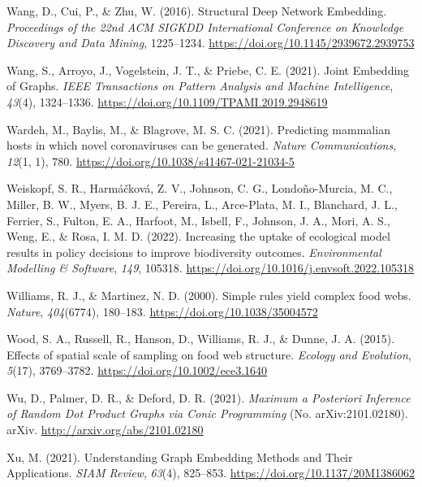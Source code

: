 \documentclass[10pt,oneside]{article}
\newlength{\cslhangindent}
\newenvironment{CSLReferences}[2] %
 {%
  \setlength{\parindent}{0pt}
  \ifodd #1 \everypar{\setlength{\hangindent}{\cslhangindent}}\ignorespaces\fi
  \ifnum #2 > 0
  \setlength{\parskip}{#2\baselineskip}
  \fi
 }%
 {}
\begin{document}
\begin{CSLReferences}{1}{0}
\leavevmode{}%
Wang, D., Cui, P., \& Zhu, W. (2016). Structural Deep Network Embedding.
\emph{Proceedings of the 22nd ACM SIGKDD International Conference on
Knowledge Discovery and Data Mining}, 1225--1234.
\url{https://doi.org/10.1145/2939672.2939753}

\leavevmode{}%
Wang, S., Arroyo, J., Vogelstein, J. T., \& Priebe, C. E. (2021). Joint
Embedding of Graphs. \emph{IEEE Transactions on Pattern Analysis and
Machine Intelligence}, \emph{43}(4), 1324--1336.
\url{https://doi.org/10.1109/TPAMI.2019.2948619}

\leavevmode{}%
Wardeh, M., Baylis, M., \& Blagrove, M. S. C. (2021). Predicting
mammalian hosts in which novel coronaviruses can be generated.
\emph{Nature Communications}, \emph{12}(1, 1), 780.
\url{https://doi.org/10.1038/s41467-021-21034-5}

\leavevmode{}%
Weiskopf, S. R., Harmáčková, Z. V., Johnson, C. G., Londoño-Murcia, M.
C., Miller, B. W., Myers, B. J. E., Pereira, L., Arce-Plata, M. I.,
Blanchard, J. L., Ferrier, S., Fulton, E. A., Harfoot, M., Isbell, F.,
Johnson, J. A., Mori, A. S., Weng, E., \& Rosa, I. M. D. (2022).
Increasing the uptake of ecological model results in policy decisions to
improve biodiversity outcomes. \emph{Environmental Modelling \&
Software}, \emph{149}, 105318.
\url{https://doi.org/10.1016/j.envsoft.2022.105318}

\leavevmode{}%
Williams, R. J., \& Martinez, N. D. (2000). Simple rules yield complex
food webs. \emph{Nature}, \emph{404}(6774), 180--183.
\url{https://doi.org/10.1038/35004572}

\leavevmode{}%
Wood, S. A., Russell, R., Hanson, D., Williams, R. J., \& Dunne, J. A.
(2015). Effects of spatial scale of sampling on food web structure.
\emph{Ecology and Evolution}, \emph{5}(17), 3769--3782.
\url{https://doi.org/10.1002/ece3.1640}

\leavevmode{}%
Wu, D., Palmer, D. R., \& Deford, D. R. (2021). \emph{Maximum a
Posteriori Inference of Random Dot Product Graphs via Conic Programming}
(No. arXiv:2101.02180). arXiv. \url{http://arxiv.org/abs/2101.02180}

\leavevmode{}%
Xu, M. (2021). Understanding Graph Embedding Methods and Their
Applications. \emph{SIAM Review}, \emph{63}(4), 825--853.
\url{https://doi.org/10.1137/20M1386062}


\end{CSLReferences}
\end{document}
